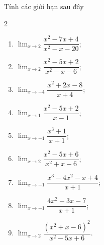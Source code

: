 \begin{ex}%

	Tính các giới hạn sau  đây
	\begin{multicols}{2}
		\begin{enumerate}
			\item $\displaystyle\lim_{x  \to 2} \dfrac{x^2 - 7x + 4}{x^2 - x - 20}$;
			\item $\displaystyle\lim_{x  \to 2} \dfrac{x^2 - 5x + 2}{x^2 - x - 6}$;
			\item $\displaystyle\lim_{x \to -4} \dfrac{x^2 + 2x - 8}{x + 4}$; 
			\item $\displaystyle\lim_{x \to  1} \dfrac{x^2 - 5x + 2}{x - 1}$;
			\item $\displaystyle\lim_{x \to -1} \dfrac{x^3 + 1}{x + 1}$; 
			\item $\displaystyle\lim_{x \to 2} \dfrac{x^2 - 5x + 6}{x^2 +  x - 6}$;
			\item $\displaystyle\lim_{x \to -1} \dfrac{x^3 - 4x^2 - x + 4}{x  + 1}$;
			\item $\displaystyle\lim_{x \to -1} \dfrac{4x^2 - 3x  - 7}{x + 1}$;
			\item $\displaystyle\lim_{x \to 2} \dfrac{(x^2 + x - 6)^2}{x^2  - 5x + 6}$.
		\end{enumerate}
	\end{multicols}
\end{ex}
